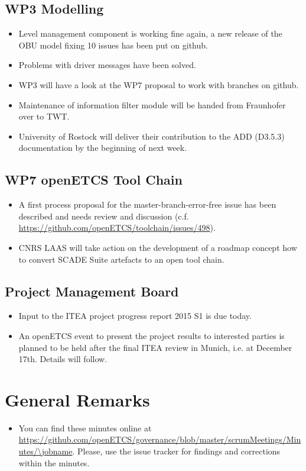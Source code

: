 \documentclass[a4paper, 11pt]{article}
\begin{document}
\subsection{WP3 Modelling}

\begin{itemize}
\item Level management component is working fine again, a new release of the OBU model fixing 10 issues has been put on github.
\item Problems with driver messages have been solved.
\item WP3 will have a look at the WP7 proposal to work with branches on github.
\item Maintenance of information filter module will be handed from Fraunhofer over to TWT.
\item University of Rostock will deliver their contribution to the ADD (D3.5.3) documentation by the beginning of next week.
\end{itemize}

\subsection{WP7 openETCS Tool Chain}

\begin{itemize}
\item A first process proposal for the master-branch-error-free issue has been described and needs review and discussion (c.f. \url{https://github.com/openETCS/toolchain/issues/498}).
\item CNRS LAAS will take action on the development of a roadmap concept how to convert SCADE Suite artefacts to an open tool chain.
\end{itemize}

\subsection{Project Management Board}

\begin{itemize}
\item Input to the ITEA project progress report 2015 S1 is due today.
\item An openETCS event to present the project results to interested parties is planned to be held after the final ITEA review in Munich, i.e. at December 17th. Details will follow.
\end{itemize}


\section{General Remarks}

\begin{itemize}
\item You can find these minutes online at \url{https://github.com/openETCS/governance/blob/master/scrumMeetings/Minutes/\jobname}. Please, use the issue tracker for findings and corrections within the minutes.
\end{itemize}
\end{document}
